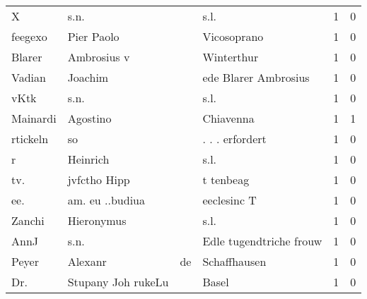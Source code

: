 \begin{center}
\begin{tiny}
\begin{longtabu}{llllrr}
                        X &                               s.n. &             &                                        s.l. &          1 &         0 \\
                  feegexo &                         Pier Paolo &             &                                 Vicosoprano &          1 &         0 \\
                   Blarer &                        Ambrosius v &             &                                  Winterthur &          1 &         0 \\
                   Vadian &                            Joachim &             &                        ede Blarer Ambrosius &          1 &         0 \\
                     vKtk &                               s.n. &             &                                        s.l. &          1 &         0 \\
                 Mainardi &                           Agostino &             &                                   Chiavenna &          1 &         1 \\
                 rtickeln &                                 so &             &                             . . . erfordert &          1 &         0 \\
                        r &                           Heinrich &             &                                        s.l. &          1 &         0 \\
                      tv. &                       jvfctho Hipp &             &                                   t tenbeag &          1 &         0 \\
                      ee. &                    am. eu ..budiua &             &                                 eeclesinc T &          1 &         0 \\
                   Zanchi &                         Hieronymus &             &                                        s.l. &          1 &         0 \\
                     AnnJ &                               s.n. &             &                     Edle tugendtriche frouw &          1 &         0 \\
                    Peyer &                            Alexanr &          de &                                Schaffhausen &          1 &         0 \\
                      Dr. &                 Stupany Joh rukeLu &             &                                       Basel &          1 &         0 \\

\end{longtabu}
\end{tiny}
\end{center}
